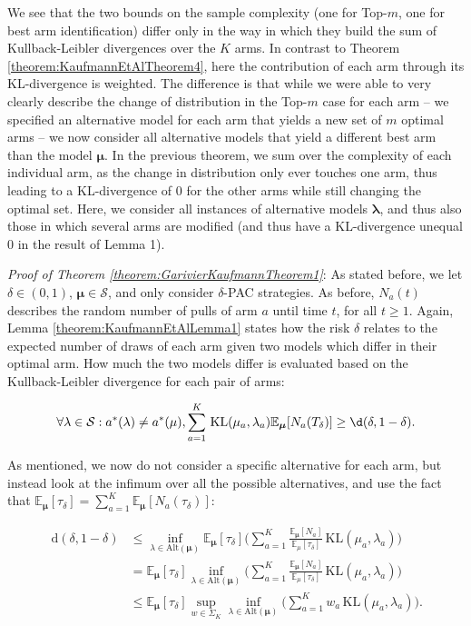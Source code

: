 \documentclass[11pt,]{article}
\newcommand{\KL}{\,\text{KL}}
\newcommand{\der}{\,\text{d}}
\begin{document}
We see that the two bounds on the sample complexity (one for Top-\(m\),
one for best arm identification) differ only in the way in which they
build the sum of Kullback-Leibler divergences over the \(K\) arms. In
contrast to Theorem \ref{theorem:KaufmannEtAlTheorem4}, here the
contribution of each arm through its KL-divergence is weighted. The
difference is that while we were able to very clearly describe the
change of distribution in the Top-\(m\) case for each arm -- we
specified an alternative model for each arm that yields a new set of
\(m\) optimal arms -- we now consider all alternative models that yield
a different best arm than the model \(\bm{\mu}\). In the previous
theorem, we sum over the complexity of each individual arm, as the
change in distribution only ever touches one arm, thus leading to a
KL-divergence of 0 for the other arms while still changing the optimal
set. Here, we consider all instances of alternative models
\(\bm{\lambda}\), and thus also those in which several arms are modified
(and thus have a KL-divergence unequal 0 in the result of Lemma 1).

\emph{Proof of Theorem \ref{theorem:GarivierKaufmannTheorem1}}: As
stated before, we let \(\delta \in (0,1)\),
\(\bm{\mu} \in \mathcal{S}\), and only consider \(\delta\)-PAC
strategies. As before, \(N_a(t)\) describes the random number of pulls
of arm \(a\) until time \(t\), for all \(t\geq 1\). Again, Lemma
\ref{theorem:KaufmannEtAlLemma1} states how the risk \(\delta\) relates
to the expected number of draws of each arm given two models which
differ in their optimal arm. How much the two models differ is evaluated
based on the Kullback-Leibler divergence for each pair of arms:

\begin{equation*}
\forall \lambda \in \mathcal{S}: a^*(\lambda) \neq a^*(\mu), \sum_{a=1}^K \KL(\mu_a,\lambda_a)\mathbb{E}_{\bm{\mu}}[N_a(T_{\delta})] \geq \d(\delta, 1- \delta).
\end{equation*}

As mentioned, we now do not consider a specific alternative for each
arm, but instead look at the infimum over all the possible alternatives,
and use the fact that
\(\mathbb{E}_{\bm{\mu}}[\tau_{\delta}] = \sum_{a=1}^K \mathbb{E}_{\bm{\mu}}[N_a(\tau_{\delta})]\):

\begin{align*}
\der(\delta, 1-\delta) & \leq \inf_{\lambda \in \text{Alt}(\bm{\mu})} \mathbb{E}_{\bm{\mu}}[\tau_{\delta}] \Big(\sum_{a=1}^K \frac{\mathbb{E}_{\bm{\mu}}[N_a]}{\mathbb{E}_{\mu}[\tau_{\delta}]} \KL(\mu_a, \lambda_a)\Big) \\
& = \mathbb{E}_{\bm{\mu}}[\tau_{\delta}] \inf_{\lambda \in \text{Alt}(\bm{\mu})} \Big(\sum_{a=1}^K \frac{\mathbb{E}_{\bm{\mu}}[N_a]}{\mathbb{E}_{\mu}[\tau_{\delta}]} \KL(\mu_a, \lambda_a)\Big) \\
& \leq \mathbb{E}_{\bm{\mu}}[\tau_{\delta}] \sup_{w \in \Sigma_K} \inf_{\lambda \in \text{Alt}(\bm{\mu})} \Big(\sum_{a=1}^K w_a \KL(\mu_a, \lambda_a)\Big).
\end{align*}
\end{document}
